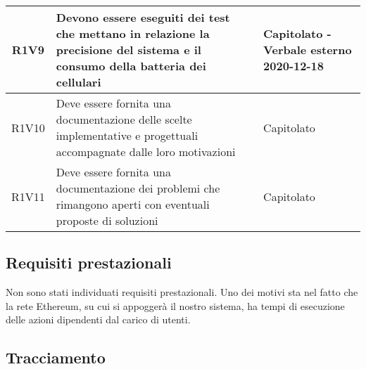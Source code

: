 \begin{center}
\begin{longtable}{|c|p{10cm}|p{4cm}|}
R1V9&Devono essere eseguiti dei test che mettano in relazione la precisione del sistema e il consumo della batteria dei cellulari	& Capitolato - Verbale esterno 2020-12-18	\\
		\hline
R1V10&Deve essere fornita una documentazione delle scelte implementative e progettuali accompagnate dalle loro motivazioni	& Capitolato	\\
		\hline
	R1V11	&Deve essere fornita una documentazione dei problemi che rimangono aperti con eventuali proposte di soluzioni	& Capitolato	\\
		\hline
	\end{longtable}
\end{center}

\subsection{Requisiti prestazionali}
Non sono stati individuati requisiti prestazionali. Uno dei motivi sta nel fatto che la rete Ethereum, su cui si appoggerà il nostro sistema, ha tempi di esecuzione delle azioni dipendenti dal carico di utenti.
%		
%		

\subsection{Tracciamento}
